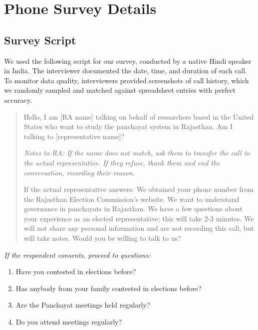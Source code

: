 \documentclass[12pt]{article}
\begin{document}

\clearpage
\section{Phone Survey Details}\label{sec:app_phone}

\subsection{Survey Script}\label{sec:phone_survey_script}

We used the following script for our survey, conducted by a native Hindi speaker in India. The interviewer documented the date, time, and duration of each call. To monitor data quality, interviewers provided screenshots of call history, which we randomly sampled and matched against spreadsheet entries with perfect accuracy.

\begin{quote}
Hello, I am [RA name] talking on behalf of researchers based in the United States who want to study the panchayat system in Rajasthan. Am I talking to [representative name]?

\medskip
\textit{Notes to RA: If the name does not match, ask them to transfer the call to the actual representative. If they refuse, thank them and end the conversation, recording their reason.}

\medskip
If the actual representative answers: We obtained your phone number from the Rajasthan Election Commission's website. We want to understand governance in panchayats in Rajasthan. We have a few questions about your experience as an elected representative; this will take 2-3 minutes. We will not share any personal information and are not recording this call, but will take notes. Would you be willing to talk to us?
\end{quote}

\textit{If the respondent consents, proceed to questions:}
\begin{enumerate}
    \item Have you contested in elections before?
    \item Has anybody from your family contested in elections before?
    \item Are the Panchayat meetings held regularly?
    \item Do you attend meetings regularly?
\end{enumerate}
\end{document}
